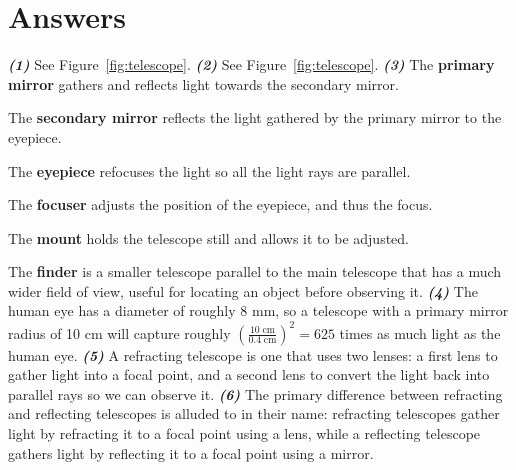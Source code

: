 \documentclass[11pt]{article}
\begin{document}
\section{Answers}
\textbf{\emph{(1)}}
See Figure~\ref{fig:telescope}.
\newline
\newline
\noindent
\textbf{\emph{(2)}}
See Figure~\ref{fig:telescope}.
\newline
\newline
\noindent
\textbf{\emph{(3)}}
The \textbf{primary mirror} gathers and reflects light towards the secondary mirror.

The \textbf{secondary mirror} reflects the light gathered by the primary mirror to the eyepiece.

The \textbf{eyepiece} refocuses the light so all the light rays are parallel.

The \textbf{focuser} adjusts the position of the eyepiece, and thus the focus.

The \textbf{mount} holds the telescope still and allows it to be adjusted.

The \textbf{finder} is a smaller telescope parallel to the main telescope that has a much wider field of view, useful for locating an object before observing it.
\newline
\newline
\noindent
\textbf{\emph{(4)}}
The human eye has a diameter of roughly 8 mm, so a telescope with a primary mirror radius of 10 cm will capture roughly $\left(\frac{10\;\textrm{cm}}{0.4\;\textrm{cm}}\right)^2 = 625$ times as much light as the human eye.
\newline
\newline
\noindent
\textbf{\emph{(5)}}
A refracting telescope is one that uses two lenses: a first lens to gather light into a focal point, and a second lens to convert the light back into parallel rays so we can observe it.
\newline
\newline
\noindent
\textbf{\emph{(6)}}
The primary difference between refracting and reflecting telescopes is alluded to in their name: refracting telescopes gather light by refracting it to a focal point using a lens, while a reflecting telescope gathers light by reflecting it to a focal point using a mirror.
\end{document}
